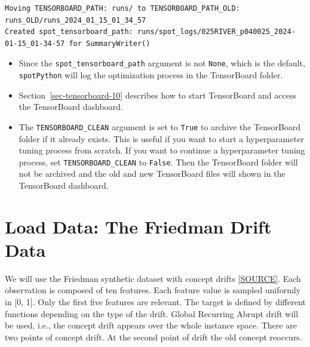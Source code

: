 \documentclass[
  letterpaper,
  DIV=11,
  numbers=noendperiod]{scrreprt}
\providecommand{\tightlist}{%
  \setlength{\itemsep}{0pt}\setlength{\parskip}{0pt}}\usepackage{longtable,booktabs,array}
\begin{document}
\begin{verbatim}
Moving TENSORBOARD_PATH: runs/ to TENSORBOARD_PATH_OLD: runs_OLD/runs_2024_01_15_01_34_57
Created spot_tensorboard_path: runs/spot_logs/025RIVER_p040025_2024-01-15_01-34-57 for SummaryWriter()
\end{verbatim}

\begin{tcolorbox}[enhanced jigsaw, rightrule=.15mm, coltitle=black, title=\textcolor{quarto-callout-tip-color}{\faLightbulb}\hspace{0.5em}{Tip: TensorBoard}, opacitybacktitle=0.6, bottomrule=.15mm, opacityback=0, left=2mm, colback=white, leftrule=.75mm, colframe=quarto-callout-tip-color-frame, colbacktitle=quarto-callout-tip-color!10!white, toprule=.15mm, toptitle=1mm, bottomtitle=1mm, titlerule=0mm, breakable, arc=.35mm]

\begin{itemize}
\tightlist
\item
  Since the \texttt{spot\_tensorboard\_path} argument is not
  \texttt{None}, which is the default, \texttt{spotPython} will log the
  optimization process in the TensorBoard folder.
\item
  Section~\ref{sec-tensorboard-10} describes how to start TensorBoard
  and access the TensorBoard dashboard.
\item
  The \texttt{TENSORBOARD\_CLEAN} argument is set to \texttt{True} to
  archive the TensorBoard folder if it already exists. This is useful if
  you want to start a hyperparameter tuning process from scratch. If you
  want to continue a hyperparameter tuning process, set
  \texttt{TENSORBOARD\_CLEAN} to \texttt{False}. Then the TensorBoard
  folder will not be archived and the old and new TensorBoard files will
  shown in the TensorBoard dashboard.
\end{itemize}

\end{tcolorbox}

\section{Load Data: The Friedman Drift
Data}\label{load-data-the-friedman-drift-data}

We will use the Friedman synthetic dataset with concept drifts
\href{https://riverml.xyz/0.18.0/api/datasets/synth/FriedmanDrift/}{{[}SOURCE{]}}.
Each observation is composed of ten features. Each feature value is
sampled uniformly in {[}0, 1{]}. Only the first five features are
relevant. The target is defined by different functions depending on the
type of the drift. Global Recurring Abrupt drift will be used, i.e., the
concept drift appears over the whole instance space. There are two
points of concept drift. At the second point of drift the old concept
reoccurs.
\end{document}
